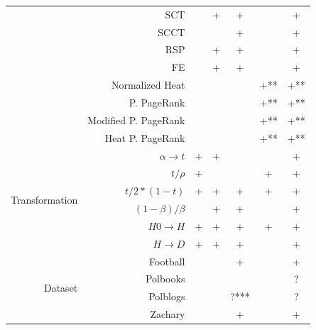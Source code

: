 \documentclass{article}
\begin{document}
\begin{table}[H]
\begin{tabular}{rr|cccc|c}
                & SCT                      &            & +        & +      &             & +      \\
                & SCCT                     &            &          & +      &             & +      \\
                & RSP                      &            & +        & +      &             & +      \\
                & FE                       &            & +        & +      &             & +      \\
                & Normalized Heat          &            &          &        & +**         & \cellcolor{yellow!25} +** \\
                & P. PageRank              &            &          &        & +**         & \cellcolor{yellow!25} +** \\
                & Modified P. PageRank     &            &          &        & +**         & \cellcolor{yellow!25} +** \\
                & Heat P. PageRank         &            &          &        & +**         & \cellcolor{yellow!25} +** \\
                \hline
\multirow{6}{*}{Transformation} & $\alpha \rightarrow t$ & + & +   &        &             & +      \\
                & $t / \rho$               & +          &          &        & +           & +      \\
                & $t / 2*(1 - t)$          & +          & +        & +      & +           & +      \\
                & $(1 - \beta) / \beta$    &            & +        & +      &             & +      \\
                & $H0 \rightarrow H$       & +          & +        & +      & +           & +      \\
                & $H \rightarrow D$        & +          & +        & +      &             & +      \\
                \hline
\multirow{5}{*}{Dataset} & Football        &            &          & +      &             & +      \\
                & Polbooks                 &            &          &        &             & \cellcolor{yellow!25} ? \\
                & Polblogs                 &            &          & ?***   &             & \cellcolor{yellow!25} ? \\
                & Zachary                  &            &          & +      &             & +      \\

\end{tabular}
\end{table}
\end{document}
